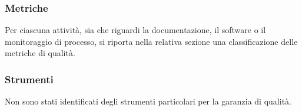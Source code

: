 	\subsubsection{Metriche}

		Per ciascuna attività, sia che riguardi la documentazione, il software o il monitoraggio di processo, si riporta nella relativa sezione una classificazione delle metriche di qualità.

	\subsubsection{Strumenti}

	Non sono stati identificati degli strumenti particolari per la garanzia di qualità.







		
